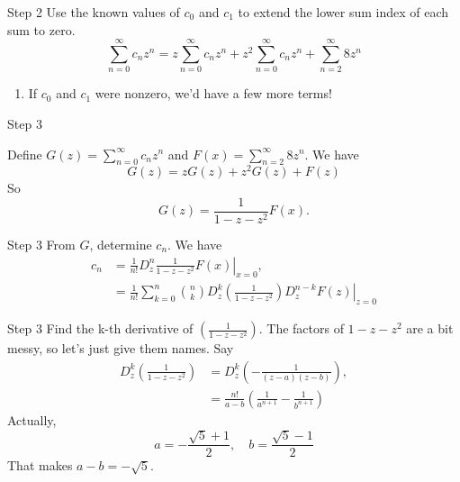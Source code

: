 \documentclass[portrait,fleqn,12pt]{beamer}
\newenvironment{handlist}
   {\begin{enumerate}[\faHandPointRight]
       \addtolength{\itemsep}{0.0\itemsep}}
     {\end{enumerate}}
\begin{document}
\begin{frame}{Step 2}
Use the known values of $c_0$ and $c_1$ to extend the lower sum index of each sum to zero.
\begin{equation}
  \sum_{n=0}^\infty c_{n} z^n  =  z \sum_{n=0}^\infty c_{n} z^{n} +  z^2 \sum_{n=0}^\infty c_{n} z^{n} +  \sum_{n=2}^\infty 8 z^n
\end{equation}
\begin{handlist}
\item If $c_0$ and $c_1$ were nonzero, we'd have a few more terms!
\end{handlist}
\end{frame}

\begin{frame}{Step 3}

Define $G(z) =  \sum_{n=0}^\infty c_{n} z^n$ and $F(x) = \sum_{n=2}^\infty 8 z^n$. We have
\begin{equation}
  G(z) = z G(z) + z^2 G(z) + F(z)
\end{equation}
So 
\begin{equation}
  G(z) = \frac{1}{1-z-z^2} F(x).
\end{equation}



\end{frame}
\begin{frame}{Step 3}
From $G$, determine $c_n$. We have
\begin{align*}
 c_n &= \frac{1}{n!}  \left. D^n_z  \frac{1}{1-z-z^2} F(x) \right  \vert_{x=0}, \\
       &= \frac{1}{n!}  \left. \sum_{k=0}^n \binom{n}{k} D^k_z \left( \frac{1}{1-z-z^2} \right)  D^{n-k} _z F(z )  \right \vert_{z=0} 
\end{align*}

\end{frame}

\begin{frame}{Step 3}
Find the k-th derivative of $\left( \frac{1}{1-z-z^2} \right) $.   The factors of $1-z-z^2$ are a bit messy, so let's just give them names. Say
\begin{align*}
   D^k_z \left( \frac{1}{1-z-z^2} \right)  &=  D^k_z \left( -\frac{1}{(z-a)(z-b)} \right) , \\
                                                                       &=   \frac{n!}{a-b} \left(\frac{1}{a^{n+1}} - \frac{1}{b^{n+1}} \right)
\end{align*}
Actually,
\[
   a =  -\frac{\sqrt{5}+1}{2}, \quad b = \frac{\sqrt{5}-1}{2}
\]
That makes $a-b = -\sqrt{5}$. 
\end{frame}
\end{document}
